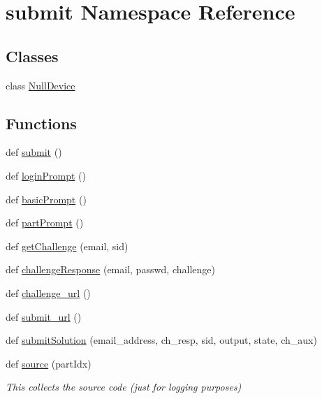 \hypertarget{namespacesubmit}{}\section{submit Namespace Reference}
\label{namespacesubmit}
\subsection*{Classes}
\begin{DoxyCompactItemize}
\item 
class \hyperlink{classsubmit_1_1_null_device}{Null\+Device}
\end{DoxyCompactItemize}
\subsection*{Functions}
\begin{DoxyCompactItemize}
\item 
def \hyperlink{namespacesubmit_a422ed6f68d9a9d215dfb92f9934882d5}{submit} ()
\item 
def \hyperlink{namespacesubmit_afecc3223519428c30538471202d10692}{login\+Prompt} ()
\item 
def \hyperlink{namespacesubmit_a1e6233dc99672a4f66e32cd4adc47e73}{basic\+Prompt} ()
\item 
def \hyperlink{namespacesubmit_a1665831c4fd39bb4d7ba08899da63d23}{part\+Prompt} ()
\item 
def \hyperlink{namespacesubmit_a90c986e109604a289f269b5a4cbac3e8}{get\+Challenge} (email, sid)
\item 
def \hyperlink{namespacesubmit_a5a62f8fd8a64631c549fad5b4bbcef69}{challenge\+Response} (email, passwd, challenge)
\item 
def \hyperlink{namespacesubmit_a252ec6fe960a22e6ecfb938b3f36be40}{challenge\+\_\+url} ()
\item 
def \hyperlink{namespacesubmit_a627eab5cc6807a39e88f4289a153cdc9}{submit\+\_\+url} ()
\item 
def \hyperlink{namespacesubmit_a60851498bd1a010849ce5eea631d5db4}{submit\+Solution} (email\+\_\+address, ch\+\_\+resp, sid, output, state, ch\+\_\+aux)
\item 
def \hyperlink{namespacesubmit_aa52c375125af38db66421e6be9699b6b}{source} (part\+Idx)
\begin{DoxyCompactList}\small\item\em This collects the source code (just for logging purposes) \end{DoxyCompactList}\end{DoxyCompactItemize}

